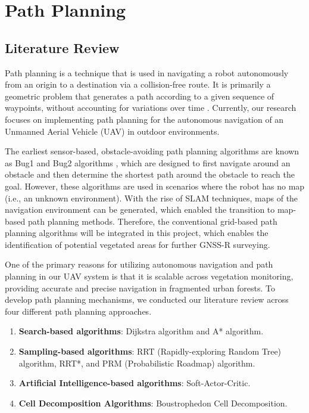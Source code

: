 \documentclass[12pt, a4paper]{article}
\begin{document}
\section{Path Planning}

\subsection{Literature Review}
Path planning is a technique that is used in navigating a robot autonomously
from an origin to a destination via a collision-free route. It is primarily a
geometric problem that generates a path according to a given sequence of
waypoints, without accounting for variations over time
\cite{Gasparetto2015}. Currently, our research focuses on implementing path
planning for the autonomous navigation of an Unmanned Aerial Vehicle (UAV) in
outdoor environments.

The earliest sensor-based, obstacle-avoiding path planning algorithms are known
as Bug1 and Bug2 algorithms \cite{choset2005principles}, which are designed to
first navigate around an obstacle and then determine the shortest path around
the obstacle to reach the goal. However, these algorithms are used
in scenarios where the robot has no map (i.e., an unknown environment). With the
rise of SLAM techniques, maps of the navigation environment can be generated,
which enabled the transition to map-based path planning methods. Therefore, the
conventional grid-based path planning algorithms will be integrated in this
project, which enables the identification of potential vegetated areas for
further GNSS-R surveying.

One of the primary reasons for utilizing autonomous navigation and path planning
in our UAV system is that it is scalable across vegetation monitoring, providing
accurate and precise navigation in fragmented urban forests. To develop path
planning mechanisms, we conducted our literature review across four different
path planning approaches. 

\begin{enumerate} 
    \item \textbf{Search-based algorithms}: Dijkstra algorithm and A* algorithm.
    \item \textbf{Sampling-based algorithms}: RRT (Rapidly-exploring Random Tree)
    algorithm, RRT*, and PRM (Probabilistic Roadmap) algorithm.
    \item \textbf{Artificial Intelligence-based algorithms}: Soft-Actor-Critic.
    \item \textbf{Cell Decomposition Algorithms}: Boustrophedon Cell Decomposition.
\end{enumerate}
\end{document}
